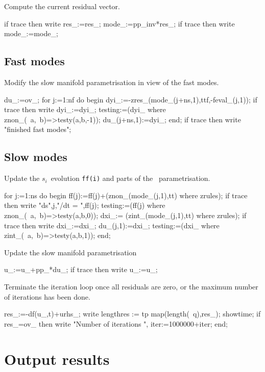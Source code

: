 \documentclass[11pt,a5paper]{article}
\begin{document}
Compute the current residual vector.
\begin{reduce}
  if trace then write res_:=res_;
  mode_:=pp_inv*res_;
  if trace then write mode_:=mode_;
\end{reduce}




\subsection{Fast modes}

Modify the slow manifold parametrisation in view of the fast
modes.
\begin{reduce}
  du_:=ov_;
  for j:=1:nf do begin  
    dyi_:=-zres_(mode_(j+ns,1),ttf,-feval_(j,1));
    if trace then write dyi_:=dyi_;
    testing:=(dyi_ where znon_(~a,~b)=>testy(a,b,-1));
    du_(j+ns,1):=dyi_;
  end;
if trace then write "finished fast modes";
\end{reduce}



\subsection{Slow modes}

Update the $s_i$~evolution \verb|ff(i)| and parts of the
\uv~parametrisation. 
\begin{reduce}
  for j:=1:ns do begin
    ff(j):=ff(j)+(znon_(mode_(j,1),tt) where zrules);
    if trace then write "ds",j,"/dt = ",ff(j);
    testing:=(ff(j) where znon_(~a,~b)=>testy(a,b,0));
    dxi_:= (zint_(mode_(j,1),tt) where zrules);
    if trace then write dxi_:=dxi_;
    du_(j,1):=dxi_;
    testing:=(dxi_ where zint_(~a,~b)=>testy(a,b,1));
  end;
\end{reduce}

Update the slow manifold parametrisation
\begin{reduce}
  u_:=u_+pp_*du_;
  if trace then write u_:=u_;
\end{reduce}


Terminate the iteration loop once all residuals are zero,
or the maximum number of iterations has been done.
\begin{reduce}
  res_:=-df(u_,t)+urhs_;
  write lengthres := tp map(length(~q),res_);
  showtime;
  if res_=ov_ then write "Number of iterations ",
    iter:=1000000+iter;
end;
\end{reduce}





\section{Output results}
\end{document}
